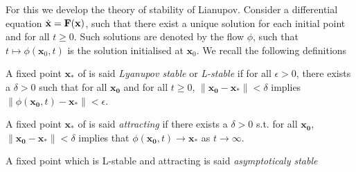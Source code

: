\begin{comment}
 We propose here to fix things, we will check numerically for the example and see that even the numerical expression isn't simple. Let's say $F(B)=B$, $G(\P)=\P^2$ and fix arbitrary the parameters making attention to $\a\d>\g\m$. Let's say $\a=4$, $\b=5$, $\m=2$, $\g=1$, $\d=3$, $\n=6$.
We get then $\Bstar=F(\Bstar)
= (5\times1+6\times4)/(5\times3+6\times2)
= 29/27$, 
$F'(\Bstar)=1$, 
$\Pstar^2=G(\Pstar)
= (4\times3-1\times2)/(5\times3+6\times2)
= 10/27$, 
$G'(\Pstar)=2\Pstar=2\sqrt{10/27}$. The matrix is then
$$ \begin{pmatrix}
     - 29/27*2 & -29/27*5*2\sqrt{10/27}
    \\
    10/27*3   & -10/27*6*2\sqrt{10/27}
\end{pmatrix} 
= \begin{pmatrix}
    -58/27 & -290 \sqrt{10/3}/81 \\ 10/9 & -40\sqrt{10/3}/27
\end{pmatrix} 
$$
with the eigenvalues 
$$\l_1=\frac{1}{243} \big(-3 (87 + 20 \sqrt{30}) + 3 i \sqrt{3 (-6523 + 4060 \sqrt{30})}\big) 
\quad \text{ and } \quad \l_2=\bar{\l}_1.$$
We have then an stable linearized system
\end{comment}
For this we develop the theory of stability of Lianupov. Consider a differential equation $\dot{\mathbf{x}}=\mathbf{F}(\mathbf{x})$, such that there exist a unique solution for each initial point and for all $t\geq0$. Such solutions are denoted by the flow $\phi$, such that $t\mapsto \phi(\mathbf{x}_0,t)$ is the solution initialised at $\mathbf{x}_0$. We recall the following definitions

\begin{definition}
 A fixed point $\mathbf{x}_*$ of  is said \emph{Lyanupov stable} or \emph{L-stable} if 
 for all $\epsilon>0$, there exists a $\delta>0$ such that for all $\mathbf{x_0}$ and for all $t\geq0$, $\|\mathbf{x_0} - \mathbf{x}_*\| < \delta$ implies $\|\phi(\mathbf{x_0},t) - \mathbf{x}_*\| < \epsilon$.
\end{definition}

\begin{definition}
A fixed point $\mathbf{x}_*$ of  is said \emph{attracting} if there exists a $\delta>0$ s.t. for all $\mathbf{x_0}$, $\|\mathbf{x_0} - \mathbf{x}_*\| < \delta$ implies that $\phi(\mathbf{x_0},t) \to \mathbf{x}_*$ as $t \to\infty$.
\end{definition}

\begin{definition}
    A fixed point which is L-stable and attracting is said \emph{asymptoticaly stable}
\end{definition}

